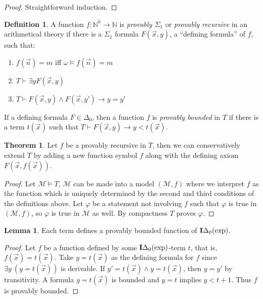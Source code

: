 \documentclass[8pt]{article}
\theoremstyle{definition}
\newtheorem{definition}{Definition}[section]
\theoremstyle{definition}
\newtheorem{theorem}{Theorem}[section]
\theoremstyle{definition}
\theoremstyle{definition}
\theoremstyle{definition}
\theoremstyle{definition}
\theoremstyle{definition}
\theoremstyle{definition}
\newtheorem{lemma}{Lemma}[section]
\theoremstyle{definition}
\theoremstyle{definition}
\theoremstyle{definition}
\theoremstyle{definition}
\theoremstyle{definition}
\theoremstyle{question}
\begin{document}
\begin{proof}
  Straightforward induction.
\end{proof}

\begin{definition}
  A function $f : \mathbb{N}^k \to \mathbb{N}$ is \emph{provably $\Sigma_1$} or \emph{provably recursive}
  in an arithmetical theory if there is a $\Sigma_1$ formula $F(\vec{x}, y)$, a ``defining formula'' of $f$, such that:
  \begin{enumerate}
    \item $f(\vec{n}) = m$ iff $\omega \models f(\vec{n}) = m$
    \item $T \vdash \exists y F(\vec{x}, y)$
    \item $T \vdash F(\vec{x}, y) \land F(\vec{x}, y') \to y = y'$
  \end{enumerate}
\end{definition}
If a defining formula $F \in \Delta_0$, then a function $f$ is \emph{provably bounded} 
in $T$ if there is a term $t(\vec{x})$ such that $T \vdash F(\vec{x}, y) \to y < t(\vec{x})$.

\begin{theorem}
  Let $f$ be a provably recursive in $T$, then we can conservatively extend $T$
  by adding a new function symbol $f$ along with the defining axiom $F(\vec{x}, f(\vec{x}))$.
\end{theorem}

\begin{proof}
  Let $\mathcal{M} \models T$, $\mathcal{M}$ can be made into a model $(\mathcal{M}, f)$ where
  we interpret $f$ as the function which is uniquely determined by the second and third conditions
  of the definitions above.
  Let $\varphi$ be a statement not involving $f$ such that $\varphi$ is true
  in $(\mathcal{M}, f)$, so $\varphi$ is true in $\mathcal{M}$ as well.
  By compactness $T$ proves $\varphi$.
\end{proof}

\begin{lemma}
  Each term defines a provably bounded function of ${\bf I}\Delta_0(\operatorname{exp})$.
\end{lemma}
\begin{proof}
  Let $f$ be a function defined by some ${\bf I}\Delta_0(\operatorname{exp})$-term $t$, 
  that is, $f(\vec{x}) = t(\vec{x})$.
  Take $y = t(\vec{x})$ as the defining formula for $f$ since 
  $\exists y \: (y = t(\vec{x}))$ is derivable.
  If $y' = t(\vec{x}) \land y = t(\vec{x})$, then $y = y'$ by transitivity.
  A formula $y = t(\vec{x})$ is bounded and $y = t$ implies $y < t + 1$.
  Thus $f$ is provably bounded.
\end{proof}
\end{document}
